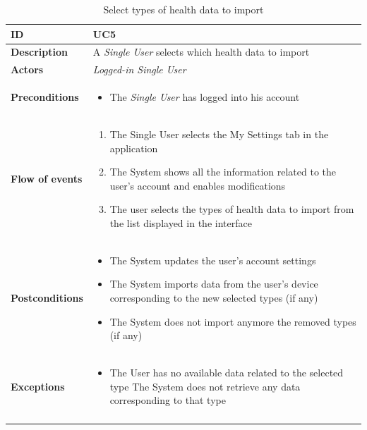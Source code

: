 \documentclass[titlepage]{article}
\begin{document}
\begin{longtable}{| p{3 cm} | p{10 cm} |} 
			\hline
			{\bf ID} & UC5 \\
			\hline
			{\bf Description} & A {\it Single User} selects which health data to import\\
			\hline
			{\bf Actors} & {\it Logged-in Single User} \\
			\hline
			{\bf Preconditions} & 		
							\begin{itemize}
								\item The {\it Single User}  has  logged into his account 
							\end{itemize}
			\\
			\hline
			{\bf Flow of events} & 
							\begin{enumerate}
								\item The Single User selects the My Settings tab in the application
\item The System shows all the information related to the user’s account and enables modifications
\item The user selects the types of health data to import from the list displayed in the interface
							\end{enumerate}
			
			 \\
			\hline
			{\bf Postconditions} & 
							\begin{itemize}
								\item The System updates the user’s account settings 
\item The System imports data from the user’s device corresponding to the new selected types (if any)
\item The System does not import anymore the removed types (if any)

							\end{itemize}
			\\
			\hline
			{\bf Exceptions} & 
							\begin{itemize}
								\item The User has no available data related to the selected type
The System does not retrieve any data corresponding to that type

							\end{itemize}
							
			\\
			\hline
			\caption{Select types of health data to import}
			\end{longtable}
\end{document}
